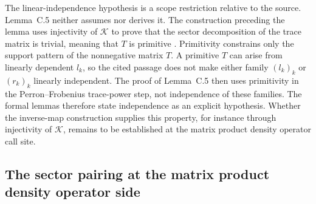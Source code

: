 \documentclass{article}
\begin{document}
The linear-independence hypothesis is a scope restriction relative to the
source. Lemma~C.5 neither assumes nor derives it. The construction preceding
the lemma uses injectivity of $\mathcal K$ to prove that the sector
decomposition of the trace matrix is trivial, meaning that $T$ is primitive
\cite[Appendix~C.2, lines~1457--1470]{Cirac2016MPDO_arXiv}. Primitivity
constrains only the support pattern of the nonnegative matrix $T$. A primitive
$T$ can arise from linearly dependent $l_k$, so the cited passage does not
make either family $(l_k)_k$ or $(r_k)_k$ linearly independent. The proof of
Lemma~C.5 then uses primitivity in the Perron--Frobenius trace-power step, not
independence of these families. The formal lemmas therefore state independence
as an explicit hypothesis. Whether the inverse-map construction supplies this
property, for instance through injectivity of $\mathcal K$, remains to be
established at the matrix product density operator call site.

\subsection{The sector pairing at the matrix product density operator side}
\label{sec:cpgsv17_sector_pairing_mpdo}
\end{document}
